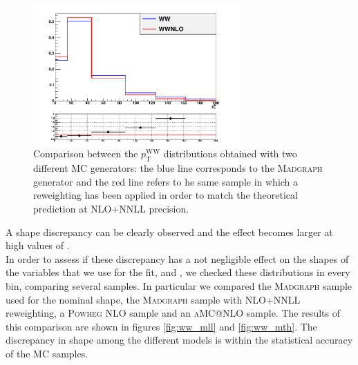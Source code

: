 \begin{figure}[b]
\centering
\includegraphics[width=0.7\textwidth]{images/WWnlo/WW_WWnlo.pdf}
\caption{Comparison between the $p_\mathrm{T}^\mathrm{WW}$ distributions obtained with two different MC generators: the blue line corresponds to the \textsc{Madgraph} generator and the red line refers to he same sample in which a reweighting has been applied in order to match the theoretical prediction at NLO+NNLL precision. }\label{fig:ww_wwnlo}
\end{figure}

A shape discrepancy can be clearly observed and the effect becomes larger at high values of \pth.\\
In order to assess if these discrepancy has a not negligible effect on the shapes of the variables that we use for the fit, \mll and \mt, we checked these distributions in every \pth bin, comparing several samples. In particular we compared the \textsc{Madgraph} sample used for the nominal shape, the \textsc{Madgraph} sample with NLO+NNLL  reweighting, a \textsc{Powheg} NLO sample and an \textsc{aMC@NLO} sample.
The results of this comparison are shown in figures \ref{fig:ww_mll} and \ref{fig:ww_mth}. The discrepancy in shape among the different models is within the statistical accuracy of the MC samples. 

